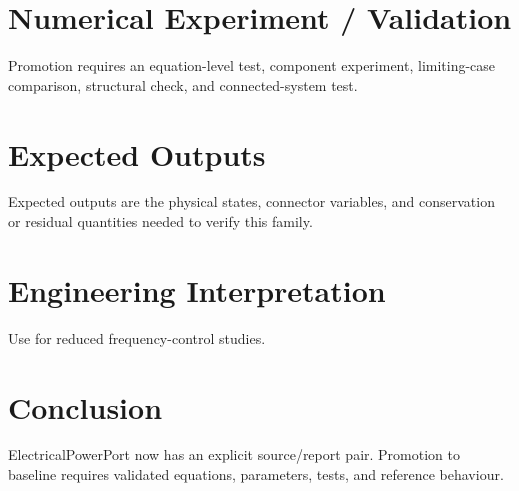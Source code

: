 \documentclass[10pt,a4paper]{article}
\begin{document}
\section{Numerical Experiment / Validation}
Promotion requires an equation-level test, component experiment, limiting-case comparison, structural check, and connected-system test.
\section{Expected Outputs}
Expected outputs are the physical states, connector variables, and conservation or residual quantities needed to verify this family.
\section{Engineering Interpretation}
Use for reduced frequency-control studies.
\section*{Conclusion}
ElectricalPowerPort now has an explicit source/report pair. Promotion to baseline requires validated equations, parameters, tests, and reference behaviour.
\end{document}
